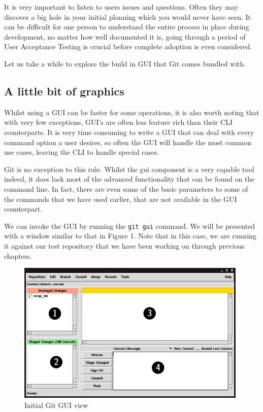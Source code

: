 It is very important to listen to users issues and questions.  Often they may discover a big hole in your initial planning which you would never have seen.  It can be difficult for one person to understand the entire process in place during development, no matter how well documented it is, going through a period of User Acceptance Testing is crucial before complete adoption is even considered.

Let us take a while to explore the build in GUI that Git comes bundled with.

\subsection{A little bit of graphics}
Whilst using a GUI can be faster for some operations, it is also worth noting that with very few exceptions, GUI's are often less feature rich than their CLI counterparts.  It is very time consuming to write a GUI that can deal with every command option a user desires, so often the GUI will handle the most common use cases, leaving the CLI to handle special cases.

Git is no exception to this rule.  Whilst the gui component is a very capable tool indeed, it does lack most of the advanced functionality that can be found on the command line.  In fact, there are even some of the basic parameters to some of the commands that we have used earlier, that are not available in the GUI counterpart.

We can invoke the GUI by running the \texttt{git gui} command.  We will be presented with a window similar to that in Figure 1.  Note that in this case, we are running it against our test repository that we have been working on through previous chapters.

\begin{figure}[hbt]
\centering
\includegraphics[width=11cm]{images/f-w5-d1.png}
\caption{Initial Git GUI view}
\end{figure}

